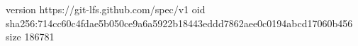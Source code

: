 version https://git-lfs.github.com/spec/v1
oid sha256:714cc60c4fdae5b050ce9a6a5922b18443eddd7862aee0c0194abcd17060b456
size 186781
